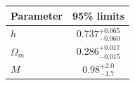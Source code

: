 \begin{tabular} { l  c}

 Parameter &  95\% limits\\
\hline
{\boldmath$h              $} & $0.737^{+0.065}_{-0.060}   $\\

{\boldmath$\Omega_m       $} & $0.286^{+0.017}_{-0.015}   $\\

{\boldmath$M              $} & $0.98^{+2.0}_{-1.7}        $\\
\hline
\end{tabular}